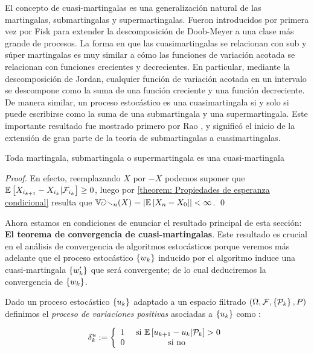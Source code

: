 \begin{remark}
	El concepto de cuasi-martingalas es una generalizaci\'on natural de las martingalas, submartingalas y supermartingalas. Fueron introducidos por primera vez por Fisk \cite{fisk:1965} para extender la descomposici\'on de Doob-Meyer a una clase m\'as grande de procesos. La forma en que las cuasimartingalas se relacionan con sub y s\'uper martingalas es muy similar a c\'omo las funciones de variaci\'on acotada se relacionan con funciones crecientes y decrecientes. En particular, mediante la descomposici\'on de Jordan, cualquier funci\'on de variaci\'on acotada en un intervalo se descompone como la suma de una funci\'on creciente y una funci\'on decreciente. De manera similar, un proceso estoc\'astico es una cuasimartingala si y solo si puede escribirse como la suma de una submartingala y una supermartingala. Este importante resultado fue mostrado primero por Rao \cite{rao:1969}, y signific\'o el inicio de la extensi\'on de gran parte de la teor\'ia de submartingalas  a cuasimartingalas.
\end{remark}

\begin{proposition}
	Toda martingala, submartingala o supermartingala es una cuasi-martingala
\end{proposition}

\begin{proof}
	En efecto, reemplazando $X$ por $-X$ podemos suponer que $\mathbb{E} \left[X_{i_{k+1}} - X_{i_k} \vert \mathcal{F}_{i_k}\right] \geq 0$, luego por \ref{theorem: Propiedades de esperanza condicional} resulta que $\mathbb{Var}_n(X) = \left\lvert\mathbb{E} \left[X_n - X_0\right]\right\rvert < \infty$. \qed
\end{proof}

Ahora estamos en condiciones de enunciar el resultado principal de esta secci\'on: \textbf{El teorema de convergencia de cuasi-martingalas}. Este resultado es crucial en el an\'alisis de convergencia de algoritmos estoc\'asticos porque veremos m\'as adelante que el proceso estoc\'astico $\left\lbrace w_k\right\rbrace$ inducido por el algoritmo induce una cuasi-martingala $\left\lbrace w_k'\right\rbrace$ que ser\'a convergente; de lo cual deduciremos la convergencia de $\left\lbrace w_k\right\rbrace$.

\begin{definition}
	\label{def: Variaciones positivas de un proceso}
	Dado un proceso estoc\'astico $\left\lbrace u_k\right\rbrace$ adaptado a un espacio filtrado $\left(\Omega, \mathcal{F}, \left\lbrace\mathcal{P}_k\right\rbrace, P\right)$ definimos el \textit{proceso de variaciones positivas} asociadas a $\left\lbrace u_k\right\rbrace$ como :
	
	\begin{equation}
	\delta^u_k := \left\lbrace \begin{array}{cc}
	1 & \text{ si } \mathbb{E} \left[{u_{k+1} - u_k} \vert \mathcal{P}_{k}\right] > 0 \\
	0 & \text{ si no }
	\end{array}\right.
	\end{equation}
	
\end{definition}

